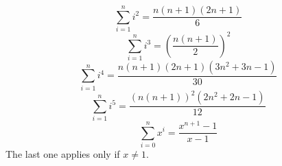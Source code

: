 
$$\sum_{i=1}^{n} i^2 = \frac{n(n+1)(2n+1)}{6}$$
$$\sum_{i=1}^{n} i^3 = (\frac{n(n+1)}{2})^2$$
$$\sum_{i=1}^{n} i^4 = \frac{n(n+1)(2n+1)(3n^2+3n-1)}{30}$$
$$\sum_{i=1}^{n} i^5 = \frac{(n(n+1))^2(2n^2+2n-1)}{12}$$
$$\sum_{i=0}^{n} x^i = \frac{x^{n+1}-1}{x-1}$$
The last one applies only if $x \neq 1$.